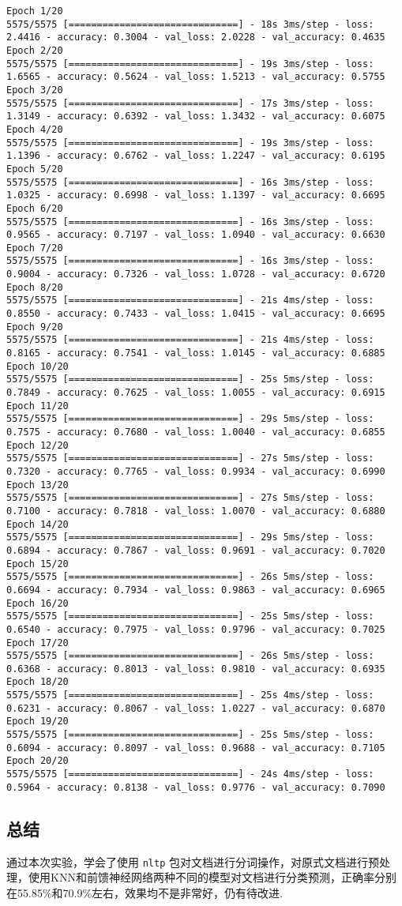 \documentclass[
]{article}
\begin{document}
\begin{verbatim}
Epoch 1/20
5575/5575 [==============================] - 18s 3ms/step - loss: 2.4416 - accuracy: 0.3004 - val_loss: 2.0228 - val_accuracy: 0.4635
Epoch 2/20
5575/5575 [==============================] - 19s 3ms/step - loss: 1.6565 - accuracy: 0.5624 - val_loss: 1.5213 - val_accuracy: 0.5755
Epoch 3/20
5575/5575 [==============================] - 17s 3ms/step - loss: 1.3149 - accuracy: 0.6392 - val_loss: 1.3432 - val_accuracy: 0.6075
Epoch 4/20
5575/5575 [==============================] - 19s 3ms/step - loss: 1.1396 - accuracy: 0.6762 - val_loss: 1.2247 - val_accuracy: 0.6195
Epoch 5/20
5575/5575 [==============================] - 16s 3ms/step - loss: 1.0325 - accuracy: 0.6998 - val_loss: 1.1397 - val_accuracy: 0.6695
Epoch 6/20
5575/5575 [==============================] - 16s 3ms/step - loss: 0.9565 - accuracy: 0.7197 - val_loss: 1.0940 - val_accuracy: 0.6630
Epoch 7/20
5575/5575 [==============================] - 16s 3ms/step - loss: 0.9004 - accuracy: 0.7326 - val_loss: 1.0728 - val_accuracy: 0.6720
Epoch 8/20
5575/5575 [==============================] - 21s 4ms/step - loss: 0.8550 - accuracy: 0.7433 - val_loss: 1.0415 - val_accuracy: 0.6695
Epoch 9/20
5575/5575 [==============================] - 21s 4ms/step - loss: 0.8165 - accuracy: 0.7541 - val_loss: 1.0145 - val_accuracy: 0.6885
Epoch 10/20
5575/5575 [==============================] - 25s 5ms/step - loss: 0.7849 - accuracy: 0.7625 - val_loss: 1.0055 - val_accuracy: 0.6915
Epoch 11/20
5575/5575 [==============================] - 29s 5ms/step - loss: 0.7575 - accuracy: 0.7680 - val_loss: 1.0040 - val_accuracy: 0.6855
Epoch 12/20
5575/5575 [==============================] - 27s 5ms/step - loss: 0.7320 - accuracy: 0.7765 - val_loss: 0.9934 - val_accuracy: 0.6990
Epoch 13/20
5575/5575 [==============================] - 27s 5ms/step - loss: 0.7100 - accuracy: 0.7818 - val_loss: 1.0070 - val_accuracy: 0.6880
Epoch 14/20
5575/5575 [==============================] - 29s 5ms/step - loss: 0.6894 - accuracy: 0.7867 - val_loss: 0.9691 - val_accuracy: 0.7020
Epoch 15/20
5575/5575 [==============================] - 26s 5ms/step - loss: 0.6694 - accuracy: 0.7934 - val_loss: 0.9863 - val_accuracy: 0.6965
Epoch 16/20
5575/5575 [==============================] - 25s 5ms/step - loss: 0.6540 - accuracy: 0.7975 - val_loss: 0.9796 - val_accuracy: 0.7025
Epoch 17/20
5575/5575 [==============================] - 26s 5ms/step - loss: 0.6368 - accuracy: 0.8013 - val_loss: 0.9810 - val_accuracy: 0.6935
Epoch 18/20
5575/5575 [==============================] - 25s 4ms/step - loss: 0.6231 - accuracy: 0.8067 - val_loss: 1.0227 - val_accuracy: 0.6870
Epoch 19/20
5575/5575 [==============================] - 25s 5ms/step - loss: 0.6094 - accuracy: 0.8097 - val_loss: 0.9688 - val_accuracy: 0.7105
Epoch 20/20
5575/5575 [==============================] - 24s 4ms/step - loss: 0.5964 - accuracy: 0.8138 - val_loss: 0.9776 - val_accuracy: 0.7090
\end{verbatim}

\hypertarget{ux603bux7ed3}{%
\subsection{总结}\label{ux603bux7ed3}}

通过本次实验，学会了使用 \texttt{nltp}
包对文档进行分词操作，对原式文档进行预处理，使用KNN和前馈神经网络两种不同的模型对文档进行分类预测，正确率分别在55.85\%和70.9\%左右，效果均不是非常好，仍有待改进.
\end{document}
